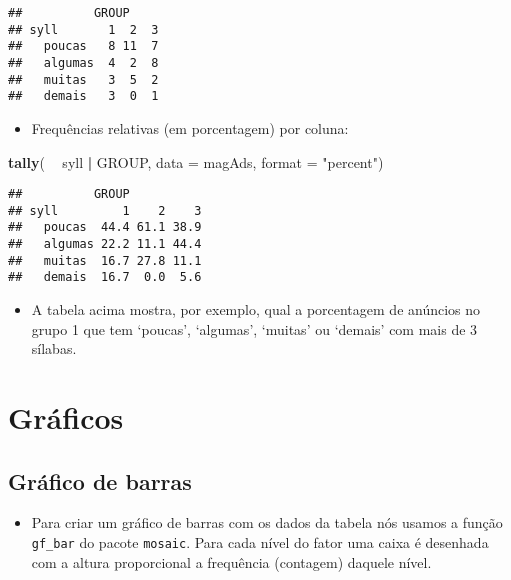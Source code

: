 \documentclass[]{article}
\newenvironment{Shaded}{\begin{snugshade}}{\end{snugshade}}
\newcommand{\KeywordTok}[1]{\textcolor[rgb]{0.13,0.29,0.53}{\textbf{#1}}}
\newcommand{\DataTypeTok}[1]{\textcolor[rgb]{0.13,0.29,0.53}{#1}}
\newcommand{\StringTok}[1]{\textcolor[rgb]{0.31,0.60,0.02}{#1}}
\newcommand{\OperatorTok}[1]{\textcolor[rgb]{0.81,0.36,0.00}{\textbf{#1}}}
\newcommand{\NormalTok}[1]{#1}
\providecommand{\tightlist}{%
  \setlength{\itemsep}{0pt}\setlength{\parskip}{0pt}}
\begin{document}
\begin{verbatim}
##          GROUP
## syll       1  2  3
##   poucas   8 11  7
##   algumas  4  2  8
##   muitas   3  5  2
##   demais   3  0  1
\end{verbatim}

\begin{itemize}
\tightlist
\item
  Frequências relativas (em porcentagem) por coluna:
\end{itemize}

\begin{Shaded}
\begin{Highlighting}[]
\KeywordTok{tally}\NormalTok{( }\OperatorTok{~}\StringTok{ }\NormalTok{syll }\OperatorTok{|}\StringTok{ }\NormalTok{GROUP, }\DataTypeTok{data =}\NormalTok{ magAds, }\DataTypeTok{format =} \StringTok{"percent"}\NormalTok{)}
\end{Highlighting}
\end{Shaded}

\begin{verbatim}
##          GROUP
## syll         1    2    3
##   poucas  44.4 61.1 38.9
##   algumas 22.2 11.1 44.4
##   muitas  16.7 27.8 11.1
##   demais  16.7  0.0  5.6
\end{verbatim}

\begin{itemize}
\tightlist
\item
  A tabela acima mostra, por exemplo, qual a porcentagem de anúncios no
  grupo 1 que tem `poucas', `algumas', `muitas' ou `demais' com mais de
  3 sílabas.
\end{itemize}

\section{Gráficos}\label{graficos}

\subsection{Gráfico de barras}\label{grafico-de-barras}

\begin{itemize}
\tightlist
\item
  Para criar um gráfico de barras com os dados da tabela nós usamos a
  função \texttt{gf\_bar} do pacote \texttt{mosaic}. Para cada nível do
  fator uma caixa é desenhada com a altura proporcional a frequência
  (contagem) daquele nível.
\end{itemize}
\end{document}
